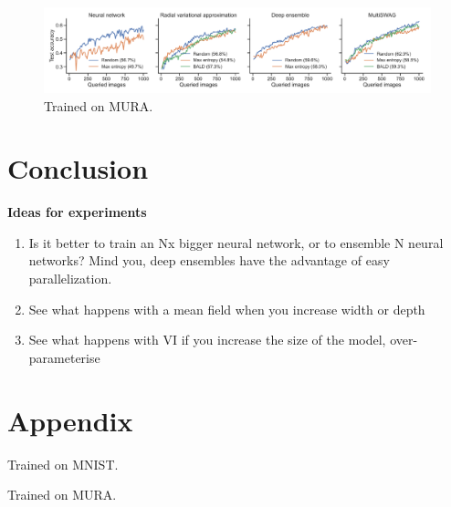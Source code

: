 \documentclass[10pt,a4paper,twocolumn]{article}
\begin{document}
\begin{figure}
    \centering
    \includegraphics[width=\textwidth]{figures/active_comparison_mura.pdf}
    \caption{Trained on MURA.}
    \label{fig:active-mura}
\end{figure}

\section{Conclusion}


\textbf{Ideas for experiments}
\begin{enumerate}
    \item Is it better to train an Nx bigger neural network, or to ensemble N neural networks? Mind you, deep ensembles have the advantage of easy parallelization.
    \item See what happens with a mean field when you increase width or depth
    \item See what happens with VI if you increase the size of the model, over-parameterise
\end{enumerate}

\printbibliography

\clearpage
\onecolumn
\appendix
\section{Appendix}
\begin{table}[h]
    \centering
    
    \caption{Trained on MNIST.}
    \label{tab:mnist}
\end{table}
\begin{table}[h]
    \centering
    
    \caption{Trained on MURA.}
    \label{tab:mura}
\end{table}
\end{document}
